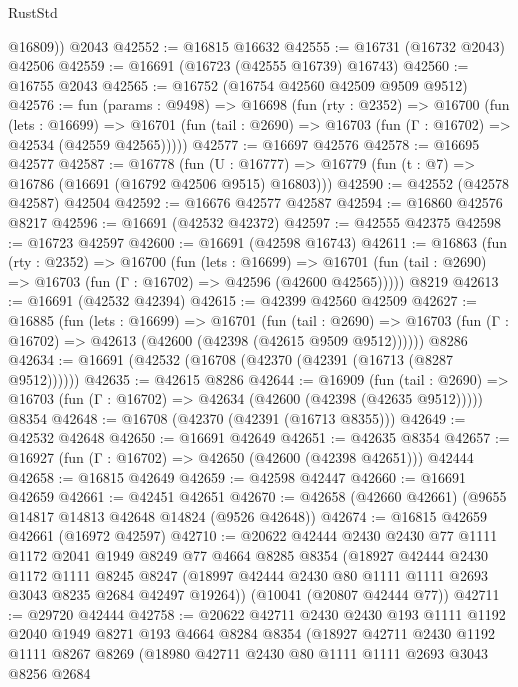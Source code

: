 \begin{lexlean}{RustStd}
\begin{coremodule}
        @16809))
    @2043
@42552 := @16815 @16632
@42555 := @16731 (@16732 @2043) @42506
@42559 := @16691 (@16723 (@42555 @16739) @16743)
@42560 := @16755 @2043
@42565 := @16752 (@16754 @42560 @42509 @9509 @9512)
@42576 := fun (params : @9498) =>
  @16698
    (fun (rty : @2352) =>
    @16700
      (fun (lets : @16699) =>
      @16701 (fun (tail : @2690) => @16703 (fun (Γ : @16702) => @42534 (@42559 @42565)))))
@42577 := @16697 @42576
@42578 := @16695 @42577
@42587 := @16778
    (fun (U : @16777) => @16779 (fun (t : @7) => @16786 (@16691 (@16792 @42506 @9515) @16803)))
@42590 := @42552 (@42578 @42587) @42504
@42592 := @16676 @42577 @42587
@42594 := @16860 @42576 @8217
@42596 := @16691 (@42532 @42372)
@42597 := @42555 @42375
@42598 := @16723 @42597
@42600 := @16691 (@42598 @16743)
@42611 := @16863
    (fun (rty : @2352) =>
    @16700
      (fun (lets : @16699) =>
      @16701 (fun (tail : @2690) => @16703 (fun (Γ : @16702) => @42596 (@42600 @42565)))))
    @8219
@42613 := @16691 (@42532 @42394)
@42615 := @42399 @42560 @42509
@42627 := @16885
    (fun (lets : @16699) =>
    @16701
      (fun (tail : @2690) =>
      @16703 (fun (Γ : @16702) => @42613 (@42600 (@42398 (@42615 @9509 @9512))))))
    @8286
@42634 := @16691 (@42532 (@16708 (@42370 (@42391 (@16713 (@8287 @9512))))))
@42635 := @42615 @8286
@42644 := @16909
    (fun (tail : @2690) => @16703 (fun (Γ : @16702) => @42634 (@42600 (@42398 (@42635 @9512)))))
    @8354
@42648 := @16708 (@42370 (@42391 (@16713 @8355)))
@42649 := @42532 @42648
@42650 := @16691 @42649
@42651 := @42635 @8354
@42657 := @16927 (fun (Γ : @16702) => @42650 (@42600 (@42398 @42651))) @42444
@42658 := @16815 @42649
@42659 := @42598 @42447
@42660 := @16691 @42659
@42661 := @42451 @42651
@42670 := @42658 (@42660 @42661) (@9655 @14817 @14813 @42648 @14824 (@9526 @42648))
@42674 := @16815 @42659 @42661 (@16972 @42597)
@42710 := @20622
    @42444
    @2430
    @2430
    @77
    @1111
    @1172
    @2041
    @1949
    @8249
    @77
    @4664
    @8285
    @8354
    (@18927
      @42444
      @2430
      @1172
      @1111
      @8245
      @8247
      (@18997 @42444 @2430 @80 @1111 @1111 @2693 @3043 @8235 @2684 @42497 @19264))
    (@10041 (@20807 @42444 @77))
@42711 := @29720 @42444
@42758 := @20622
    @42711
    @2430
    @2430
    @193
    @1111
    @1192
    @2040
    @1949
    @8271
    @193
    @4664
    @8284
    @8354
    (@18927
      @42711
      @2430
      @1192
      @1111
      @8267
      @8269
      (@18980
        @42711
        @2430
        @80
        @1111
        @1111
        @2693
        @3043
        @8256
        @2684

\end{coremodule}
\end{lexlean}
